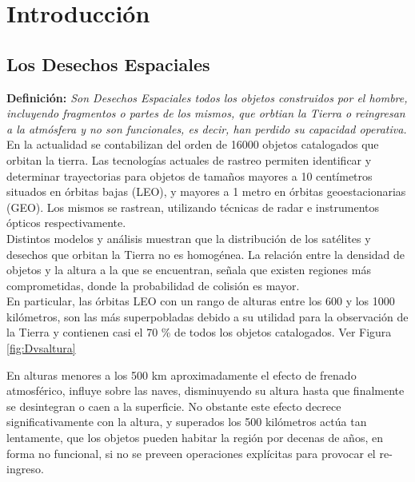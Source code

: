 \chapter{Introducción}
\label{chap:introduccion}


\section{Los Desechos Espaciales}


{\bf{Definici\'on:}}{\it{ Son Desechos Espaciales todos los objetos construidos por el hombre, incluyendo fragmentos o partes de los mismos, que orbtian la Tierra o reingresan a la atm\'osfera y no son funcionales, es decir, han perdido su capacidad operativa.}} \cite{iadcguide}\\

En la actualidad se contabilizan del orden de 16000 objetos catalogados que orbitan la tierra. Las tecnolog\'ias actuales de rastreo permiten identificar y determinar trayectorias para objetos de tamaños mayores a 10 cent\'imetros situados en \'orbitas bajas (LEO), y mayores a 1 metro en \'orbitas geoestacionarias (GEO). Los mismos se rastrean, utilizando t\'ecnicas de radar e instrumentos \'opticos respectivamente.\\

Distintos modelos y an\'alisis muestran que la distribuci\'on de los sat\'elites y desechos que orbitan la Tierra no es homog\'enea. La relaci\'on entre la densidad de objetos y la altura a la que se encuentran, señala que existen regiones m\'as comprometidas, donde la probabilidad de colisi\'on es mayor.\\

En particular, las \'orbitas LEO con un rango de alturas entre los 600 y los 1000 kil\'ometros, son las m\'as superpobladas debido a su utilidad para la observaci\'on de la Tierra y contienen casi el 70 \% de todos los objetos catalogados. Ver Figura \ref{fig:Dvsaltura}


En alturas menores a los 500 km aproximadamente el efecto de frenado atmosf\'erico, influye sobre las naves, disminuyendo su altura hasta que finalmente se desintegran o caen a la superficie. No obstante este efecto decrece significativamente con la altura, y superados los 500 kil\'ometros act\'ua tan lentamente, que los objetos pueden habitar la regi\'on por decenas de a\~nos, en forma no funcional, si no se preveen operaciones expl\'icitas para provocar el re-ingreso.\\ 

